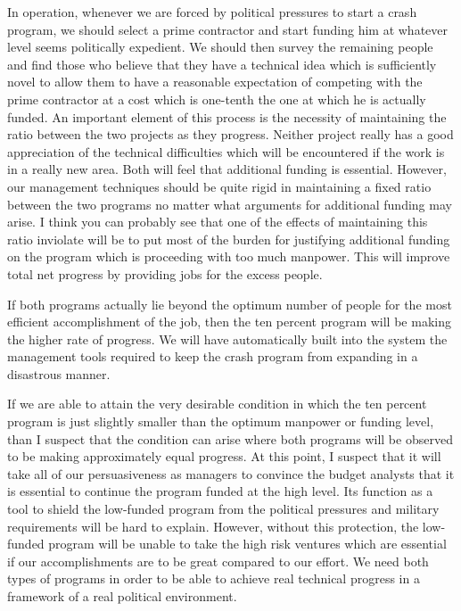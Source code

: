\documentclass{memoir}
\begin{document}
In operation, whenever we are forced by political pressures to start a crash program, we should select a prime contractor and start funding him at whatever level seems politically expedient. We should then survey the remaining people and find those who believe that they have a technical idea which is sufficiently novel to allow them to have a reasonable expectation of competing with the prime contractor at a cost which is one-tenth the one at which he is actually funded. An important element of this process is the necessity of maintaining the ratio between the two projects as they progress. Neither project really has a good appreciation of the technical difficulties which will be encountered if the work is in a really new area. Both will feel that additional funding is essential. However, our management techniques should be quite rigid in maintaining a fixed ratio between the two programs no matter what arguments for additional funding may arise. I think you can probably see that one of the effects of maintaining this ratio inviolate will be to put most of the burden for justifying additional funding on the program which is proceeding with too much manpower. This will improve total net progress by providing jobs for the excess people.

If both programs actually lie beyond the optimum number of people for the most efficient accomplishment of the job, then the ten percent program will be making the higher rate of progress. We will have automatically built into the system the management tools required to keep the crash program from expanding in a disastrous manner.

If we are able to attain the very desirable condition in which the ten percent program is just slightly smaller than the optimum manpower or funding level, than I suspect that the condition can arise where both programs will be observed to be making approximately equal progress. At this point, I suspect that it will take all of our persuasiveness as managers to convince the budget analysts that it is essential to continue the program funded at the high level. Its function as a tool to shield the low-funded program from the political pressures and military requirements will be hard to explain. However, without this protection, the low-funded program will be unable to take the high risk ventures which are essential if our accomplishments are to be great compared to our effort. We need both types of programs in order to be able to achieve real technical progress in a framework of a real political environment.
\end{document}
